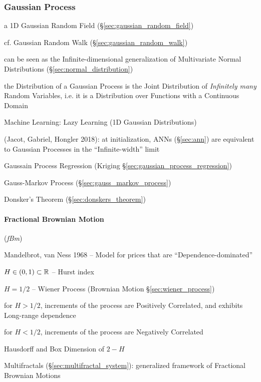 \subsubsection{Gaussian Process}\label{sec:gaussian_process}

a 1D Gaussian Random Field (\S\ref{sec:gaussian_random_field})

cf. Gaussian Random Walk (\S\ref{sec:gaussian_random_walk})

can be seen as the Infinite-dimensional generalization of Multivariate Normal
Distributions (\S\ref{sec:normal_distribution})

the Distribution of a Gaussian Process is the Joint Distribution of
\emph{Infinitely many} Random Variables, i.e. it is a Distribution over
Functions with a Continuous Domain

Machine Learning: Lazy Learning (1D Gaussian Distributions)

(Jacot, Gabriel, Hongler 2018): at initialization, ANNs (\S\ref{sec:ann}) are
equivalent to Gaussian Processes in the ``Infinite-width'' limit

Gaussain Process Regression (Kriging \S\ref{sec:gaussian_process_regression})

\fist Gauss-Markov Process (\S\ref{sec:gauss_markov_process})

\fist Donsker's Theorem (\S\ref{sec:donskers_theorem})



\paragraph{Fractional Brownian Motion}\label{sec:fractional_brownian}\hfill

(\emph{fBm})

Mandelbrot, van Ness 1968 -- Model for prices that are ``Dependence-dominated''

$H \in (0,1) \subset \mathbb{R}$ -- Hurst index

$H = 1/2$ -- Wiener Process (Brownian Motion \S\ref{sec:wiener_process})

for $H > 1/2$, increments of the process are Positively Correlated, and exhibits
Long-range dependence

for $H < 1/2$, increments of the process are Negatively Correlated

Hausdorff and Box Dimension of $2 - H$

\fist Multifractals (\S\ref{sec:multifractal_system}): generalized framework of
Fractional Brownian Motions

